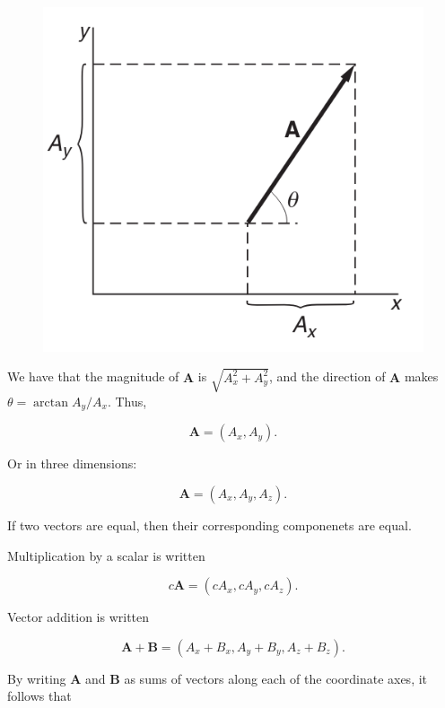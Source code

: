 \documentclass[12pt,twoside]{article}
\begin{document}
\begin{flushleft}
\begin{figure}[H]
\includegraphics[scale=.4]{images/chapter1/image1.png}
\centering
\end{figure}

We have that the magnitude of $\mathbf{A}$ is $\sqrt{\mathit{A}_{x}^{2} + \mathit{A}_{y}^{2}}$, and the direction of $\mathbf{A}$ makes
$\theta = \arctan{\mathit{A}_{y}/\mathit{A}_{x}}$. Thus,

$$
\mathbf{A} = \left(\mathit{A}_{x}, \mathit{A}_{y}\right).
$$

Or in three dimensions:

$$
\mathbf{A} = \left(\mathit{A}_{x}, \mathit{A}_{y}, \mathit{A}_{z}\right).
$$

If two vectors are equal, then their corresponding componenets are equal.

Multiplication by a scalar is written

$$
\mathit{c}\mathbf{A} = \left(\mathit{c}\mathit{A}_{x}, \mathit{c}\mathit{A}_{y}, \mathit{c}\mathit{A}_{z}\right).
$$

Vector addition is written

$$
\mathbf{A} + \mathbf{B} = \left(\mathit{A}_{x} + \mathit{B}_{x}, \mathit{A}_{y} + \mathit{B}_{y}, \mathit{A}_{z} + \mathit{B}_{z} \right).
$$

By writing $\mathbf{A}$ and $\mathbf{B}$ as sums of vectors along each of the coordinate axes, it follows that


\end{flushleft}
\end{document}

